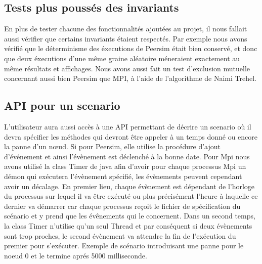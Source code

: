 \documentclass{article}
\begin{document}
			
			\subsection{Tests plus poussés des invariants}
En plus de tester chacune des fonctionnalités ajoutées au projet, il nous fallait aussi vérifier que certains invariants étaient respectés.
Par exemple nous avons vérifié que le déterminisme des éxecutions de Peersim était bien conservé, et donc que deux éxecutions d'une même graine
aléatoire méneraient exactement au même résultats et affichages. Nous avons aussi fait un test d'exclusion mutuelle concernant aussi bien Peersim que MPI, 
à l'aide de l'algorithme de Naimi Trehel.

\subsection{API pour un scenario}
L'utilisateur aura aussi accès à une API permettant de décrire un scenario où il devra spécifier les méthodes qui devront être appeler à un temps donné ou encore 
la panne d'un nœud. 
\newline
Si pour Peersim, elle utilise la procédure d'ajout d'événement et ainsi l'évènement est déclenché à la bonne date.
\newline
Pour Mpi nous avons utilisé la class Timer de java afin d'avoir pour chaque processus Mpi un démon qui exécutera l'évènement spécifié, les évènements peuvent cependant avoir un décalage.
\newline
En premier lieu, chaque évènement est dépendant de l'horloge du processus sur lequel il va être exécuté ou plus précisément l'heure à laquelle ce dernier va démarrer car chaque processus reçoit le fichier de spécification du scénario et y prend que les évênements qui le concernent.
\newline
Dans un second temps, la class Timer n'utilise qu'un seul Thread et par conséquent si deux évènements sont trop proches, le second évènement va attendre la fin de l'exécution du premier pour s'exécuter.
\newline
Exemple de scénario introduisant une panne pour le noeud 0 et le termine aprés 5000 milliseconde.
\end{document}
